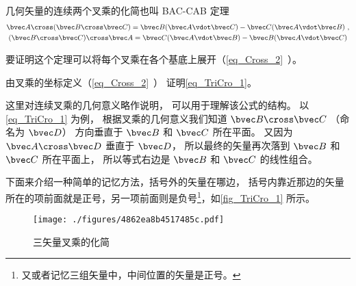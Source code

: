 

几何矢量的连续两个叉乘的化简也叫 BAC-CAB 定理
\begin{gather}
\bvec A \cross (\bvec B \cross \bvec C) = \bvec B (\bvec A \vdot \bvec C) - \bvec C (\bvec A \vdot \bvec B)\label{eq_TriCro_1}~,\\
(\bvec B \cross \bvec C) \cross \bvec A = \bvec C (\bvec A \vdot \bvec B) - \bvec B (\bvec A \vdot \bvec C)
\end{gather}

要证明这个定理可以将每个叉乘在各个基底上展开（\autoref{eq_Cross_2}~）。

\begin{exercise}{}
由叉乘的坐标定义（\autoref{eq_Cross_2}~） 证明\autoref{eq_TriCro_1}。
\end{exercise} 

这里对连续叉乘的几何意义略作说明， 可以用于理解该公式的结构。 以\autoref{eq_TriCro_1} 为例， 根据叉乘的几何意义我们知道 $\bvec B \cross \bvec C$ （命名为 $\bvec D$） 方向垂直于 $\bvec B$ 和 $\bvec C$ 所在平面。 又因为 $\bvec A \cross \bvec D$ 垂直于 $\bvec D$， 所以最终的矢量再次落到 $\bvec B$ 和 $\bvec C$ 所在平面上， 所以等式右边是 $\bvec B$ 和 $\bvec C$ 的线性组合。

下面来介绍一种简单的记忆方法，括号外的矢量在哪边， 括号内靠近那边的矢量所在的项前面就是正号，另一项前面则是负号\footnote{又或者记忆三组矢量中，中间位置的矢量是正号。}，如\autoref{fig_TriCro_1} 所示。

\begin{figure}[ht]
\centering
\texttt{[image: ./figures/4862ea8b4517485c.pdf]}
\caption{三矢量叉乘的化简}\label{fig_TriCro_1}
\end{figure}

